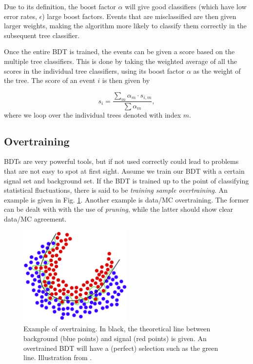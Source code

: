 Due to its definition, the boost factor $\alpha$ will give good classifiers (which have low error rates, $\epsilon$) large boost factors. Events that are misclassified are then given larger weights, making the algorithm more likely to classify them correctly in the subsequent tree classifier.

Once the entire BDT is trained, the events can be given a score based on the multiple tree classifiers. This is done by taking the weighted average of all the scores in the individual tree classifiers, using its boost factor $\alpha$ as the weight of the tree. The score of an event $i$ is then given by

\begin{equation}
s_i = \frac{\sum_m \alpha_m \cdot s_{i,m}}{\sum \alpha_m},
\end{equation}
\noindent where we loop over the individual trees denoted with index $m$.

\subsection{Overtraining}
\label{subsec:overtraining}
BDTs are very powerful tools, but if not used correctly could lead to problems that are not easy to spot at first sight. Assume we train our BDT with a certain signal set and background set. If the BDT is trained up to the point of classifying statistical fluctuations, there is said to be \textit{training sample overtraining}. An example is given in Fig. \ref{fig:overtraining}. Another example is data/MC overtraining. The former can be dealt with with the use of \textit{pruning}, while the latter should show clear data/MC agreement. 

\begin{figure}[t]
\centering
\includegraphics[width=0.5\textwidth]{chapter7/img/overtraining.png}
\caption{Example of overtraining. In black, the theoretical line between background (blue points) and signal (red points) is given. An overtrained BDT will have a (perfect) selection such as the green line. Illustration from \cite{boserpdf}.}
\label{fig:overtraining}
\end{figure}

